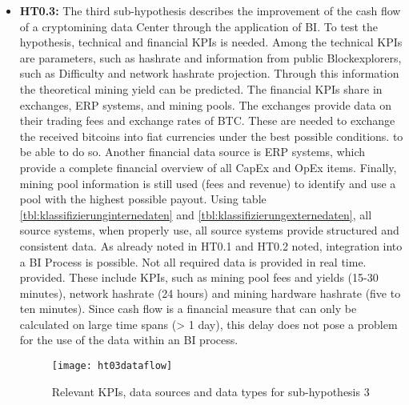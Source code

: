 \begin{itemize}
    \item \textbf{\ac{HT0.3}: }The third sub-hypothesis describes the improvement of the cash flow of a cryptomining
    data Center through the application of \ac{BI}. To test the hypothesis, technical and financial \acp{KPI}
    is needed. Among the technical \acp{KPI} are parameters, such as hashrate and information from public
    Blockexplorers, such as Difficulty and network hashrate projection. Through this information
    the theoretical mining yield can be predicted. The financial \acp{KPI} share in exchanges,
    \ac{ERP} systems, and mining pools. The exchanges provide data on their trading fees and exchange rates of
    \ac{BTC}. These are needed to exchange the received bitcoins into fiat currencies under the best possible conditions.
    to be able to do so. Another financial data source is \ac{ERP} systems, which provide a complete financial overview
    of all \ac{CapEx} and \ac{OpEx} items. Finally, mining pool information is still used (fees
    and revenue) to identify and use a pool with the highest possible payout. Using table
    \ref{tbl:klassifizierunginternedaten} and \ref{tbl:klassifizierungexternedaten}, all source systems, when properly
    use, all source systems provide structured and consistent data. As already noted in \ac{HT0.1} and \ac{HT0.2}
    noted, integration into a \ac{BI} Process is possible. Not all required data is provided in real time.
    provided. These include \acp{KPI}, such as mining pool fees and yields (15-30 minutes), network hashrate (24 hours)
    and mining hardware hashrate (five to ten minutes). Since cash flow is a financial measure that can only be calculated on large
    time spans (> 1 day), this delay does not pose a problem for the use of the data
    within an \ac{BI} process.

    \begin{figure}[H]
        \caption{Relevant KPIs, data sources and data types for sub-hypothesis 3}
        \texttt{[image: ht03dataflow]}
        \label{figure:ht03dataflow}
    \end{figure}


\end{itemize}
